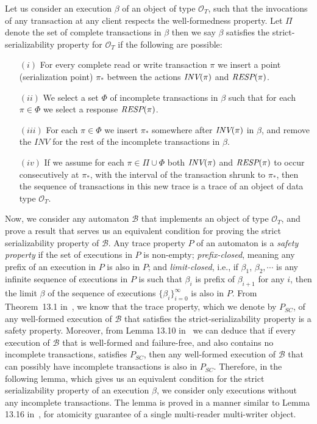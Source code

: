\begin{definition} Let us consider an execution $\beta$ of an object of type $\mathcal{O}_T$, such that the invocations of any transaction at any 
client respects the well-formedness property.  Let $\Pi$ denote the set of complete transactions in $\beta$ then we say $\beta$ satisfies the strict-serializability property for 
$\mathcal{O}_T$ if the following are possible:
\begin{enumerate}
\item[$(i)$] For every complete {\sc read} or {\sc write} transaction $\pi$ we insert a point (serialization point) $\pi_*$ between the actions   ${\textit{INV}(\pi)}$ and ${\textit{RESP}(\pi)}$.
\item[$(ii)$] We select a set $\Phi$ of incomplete transactions in $\beta$ such that for 
each $\pi \in \Phi$ we   select a response ${\textit{RESP}(\pi)}$.
\item[ $(iii)$] For each $\pi \in \Phi$ we insert $\pi_*$ somewhere after ${\textit{INV}(\pi)}$ in $\beta$, and remove the $INV$ for the rest of the incomplete transactions in $\beta$.
\item[$(iv)$] If we assume for each $\pi \in \Pi \cup \Phi$ both ${\textit{INV}(\pi)}$ and ${\textit{RESP}(\pi)}$ to occur consecutively at $\pi_*$, with the interval of the transaction shrunk to $\pi_*$,   then the sequence of transactions in this  new trace  is a trace of an object of data type  $\mathcal{O}_T$.
\end{enumerate}
\end{definition}
Now, we consider any automaton $\mathcal{B}$ that implements an object of  type $\mathcal{O}_T$, and prove a result that serves us an  equivalent condition for proving  the strict serializability property of $\mathcal{B}$. Any trace property $P$ of an automaton  is a \emph{safety property}  if the set of executions in $P$ is non-empty; \emph{prefix-closed}, meaning any prefix of an execution in $P$ is also in $P$; and \emph{limit-closed}, i.e., if $\beta_1$, $\beta_2, \cdots$ is any infinite sequence of executions in $P$ is such that $\beta_i$ is prefix of $\beta_{i+1}$ for any $i$, then the limit $\beta$ of the sequence of executions $\{\beta_i\}_{i=0}^{\infty}$  is also in $P$. From Theorem~13.1 in~\cite{Lynch1996}, we know that the trace property, which we denote by $P_{SC}$, of 
any well-formed execution of $\mathcal{B}$ that satisfies the strict-serializability property is a safety property. Moreover, from 
Lemma 13.10 in~\cite{Lynch1996} we can deduce that  if  every execution of $\mathcal{B}$ that is well-formed and failure-free, and also contains no incomplete transactions,  satisfies $P_{SC}$, then any well-formed  execution of $\mathcal{B}$ that can possibly have incomplete transactions is also in $P_{SC}$. 
Therefore, in the following lemma,  which gives us an equivalent condition for the strict serializability property of an execution $\beta$, we consider only executions without any incomplete transactions.
The lemma is proved in a manner similar to Lemma 13.16 in~\cite{Lynch1996}, for atomicity guarantee of a single multi-reader multi-writer object.


